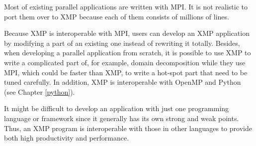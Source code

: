 Most of existing parallel applications are written with MPI. It is not
realistic to port them over to XMP because each of them consists of
millions of lines.

Because XMP is interoperable with MPI, users can develop an XMP
application by modifying a part of an existing one instead of rewriting
it totally. Besides, when developing a parallel application from
scratch, it is possible to use XMP to write a complicated part of, for
example, domain decomposition while they use MPI, which could be faster
than XMP, to write a hot-spot part that need to be tuned carefully. In
addition, XMP is interoperable with OpenMP and Python (see Chapter
\ref{python}).

It might be difficult to develop an application with just one
programming language or framework since it generally has its own strong
and weak points. Thus, an XMP program is interoperable with those in
other languages to provide both high productivity and performance.